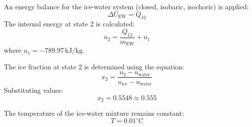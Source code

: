 An energy balance for the ice-water system (closed, isobaric, isochoric) is applied:  
\[
\Delta U_{\text{EW}} = Q_{12}
\]  
The internal energy at state 2 is calculated:  
\[
u_2 = \frac{Q_{12}}{m_{\text{EW}}} + u_1
\]  
where \( u_1 = -789.97 \, \text{kJ/kg} \).  

The ice fraction at state 2 is determined using the equation:  
\[
x_2 = \frac{u_2 - u_{\text{water}}}{u_{\text{ice}} - u_{\text{water}}}
\]  
Substituting values:  
\[
x_2 = 0.5548 \approx 0.555
\]  

The temperature of the ice-water mixture remains constant:  
\[
T = 0.01^\circ\text{C}
\]